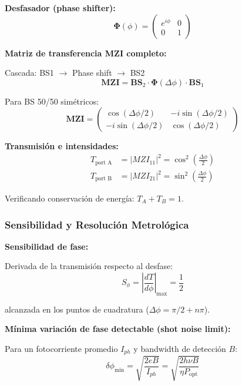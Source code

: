 \documentclass[11pt,a4paper]{article}
\begin{document}
\textbf{Desfasador (phase shifter):}
\begin{equation}
    \mathbf{\Phi}(\phi) = \begin{pmatrix} e^{i\phi} & 0 \\ 0 & 1 \end{pmatrix}
\end{equation}

\textbf{Matriz de transferencia MZI completo:}

Cascada: BS1 $\to$ Phase shift $\to$ BS2
\begin{equation}
    \mathbf{MZI} = \mathbf{BS}_2 \cdot \mathbf{\Phi}(\Delta\phi) \cdot \mathbf{BS}_1
\end{equation}

Para BS 50/50 simétricos:
\begin{equation}
    \mathbf{MZI} = \begin{pmatrix} \cos(\Delta\phi/2) & -i\sin(\Delta\phi/2) \\ -i\sin(\Delta\phi/2) & \cos(\Delta\phi/2) \end{pmatrix}
\end{equation}

\textbf{Transmisión e intensidades:}
\begin{align}
    T_{\text{port A}} &= |MZI_{11}|^2 = \cos^2\left(\frac{\Delta\phi}{2}\right) \\
    T_{\text{port B}} &= |MZI_{21}|^2 = \sin^2\left(\frac{\Delta\phi}{2}\right)
\end{align}

Verificando conservación de energía: $T_A + T_B = 1$.

\subsubsection{Sensibilidad y Resolución Metrológica}

\textbf{Sensibilidad de fase:}

Derivada de la transmisión respecto al desfase:
\begin{equation}
    S_\phi = \left|\frac{dT}{d\phi}\right|_{\text{max}} = \frac{1}{2}
\end{equation}

alcanzada en los puntos de cuadratura ($\Delta\phi = \pi/2 + n\pi$).

\textbf{Mínima variación de fase detectable (shot noise limit):}

Para un fotocorriente promedio $I_{ph}$ y bandwidth de detección $B$:
\begin{equation}
    \delta\phi_{\text{min}} = \sqrt{\frac{2eB}{I_{ph}}} = \sqrt{\frac{2h\nu B}{\eta P_{\text{opt}}}}
\end{equation}
\end{document}
